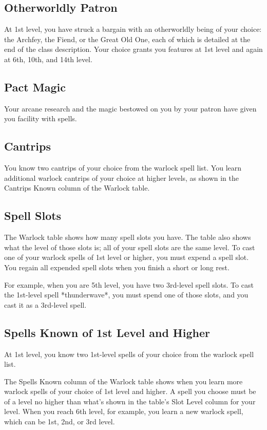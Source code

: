 \subsection{Otherworldly Patron}

At 1st level, you have struck a bargain with an otherworldly being of your choice: the Archfey, the Fiend, or the Great Old One, each of which is detailed at the end of the class description. Your choice grants you features at 1st level and again at 6th, 10th, and 14th level.

\subsection{Pact Magic}

Your arcane research and the magic bestowed on you by your patron have given you facility with spells.

\subsection{Cantrips}

You know two cantrips of your choice from the warlock spell list. You learn additional warlock cantrips of your choice at higher levels, as shown in the Cantrips Known column of the Warlock table.

\subsection{Spell Slots}

The Warlock table shows how many spell slots you have. The table also shows what the level of those slots is; all of your spell slots are the same level. To cast one of your warlock spells of 1st level or higher, you must expend a spell slot. You regain all expended spell slots when you finish a short or long rest.

For example, when you are 5th level, you have two 3rd-level spell slots. To cast the 1st-level spell *thunderwave*, you must spend one of those slots, and you cast it as a 3rd-level spell.

\subsection{Spells Known of 1st Level and Higher}

At 1st level, you know two 1st-level spells of your choice from the warlock spell list.

The Spells Known column of the Warlock table shows when you learn more warlock spells of your choice of 1st level and higher. A spell you choose must be of a level no higher than what’s shown in the table’s Slot Level column for your level. When you reach 6th level, for example, you learn a new warlock spell, which can be 1st, 2nd, or 3rd level.

